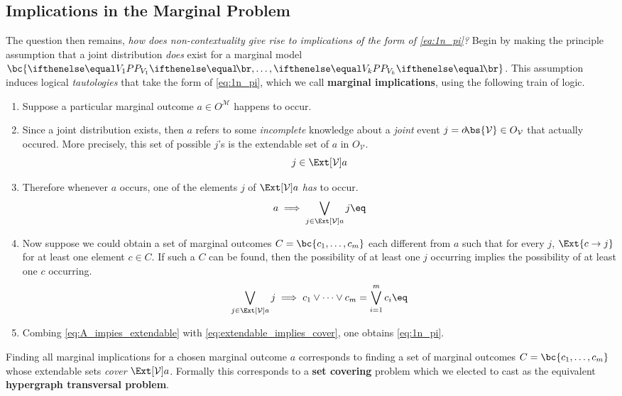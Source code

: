 \documentclass[aps, 10pt, english, twoside, pra, nofootinbib, longbibliography]{revtex4-1}
\theoremstyle{plain}
\theoremstyle{definition}
\theoremstyle{remark}
\newcommand{\term}[1]{\textcolor{Mahogany}{\textbf{#1}}}
\newcommand{\outc}[1]{o\!\bs{#1}}
\begin{document}
    \subsection{Implications in the Marginal Problem}
    \label{sec:implications_marginal_problem}
    The question then remains, \textit{how does non-contextuality give rise to implications of the form of \cref{eq:1n_pi}?} Begin by making the principle assumption that a joint distribution \textit{does} exist for a marginal model $\bc{\prob[V_1], \ldots, \prob[V_k]}$. This assumption induces logical \textit{tautologies} that take the form of \cref{eq:1n_pi}, which we call \term{marginal implications}, using the following train of logic.
    \begin{enumerate}
        \item Suppose a particular marginal outcome $a \in O^{\mathcal{M}}$ happens to occur.
        \item Since a joint distribution exists, then $a$ refers to some \textit{incomplete} knowledge about a \textit{joint} event $j = \outc{\mathcal{V}} \in O_{\mathcal{V}}$ that actually occured. More precisely, this set of possible $j$'s is the extendable set of $a$ in $O_{\mathcal{V}}$.
        \[ j \in \Ext[\mathcal{V}]{a} \]
        \item Therefore whenever $a$ occurs, one of the elements $j$ of $\Ext[\mathcal{V}]{a}$ \textit{has} to occur.
        \[ a \implies \bigvee_{j \in \Ext[\mathcal{V}]{a}} j \eq \label{eq:A_impies_extendable}\]
        \item Now suppose we could obtain a set of marginal outcomes $C = \bc{c_1, \ldots, c_m}$ each different from $a$ such that for every $j$, $\Ext{c \to j}$ for at least one element $c \in C$. If such a $C$ can be found, then the possibility of at least one $j$ occurring implies the possibility of at least one $c$ occurring.
        \[ \bigvee_{j \in \Ext[\mathcal{V}]{a}} j \implies c_1 \vee \cdots \vee c_m = \bigvee_{i = 1}^{m} c_i\eq \label{eq:extendable_implies_cover} \]

        \item Combing \cref{eq:A_impies_extendable} with \cref{eq:extendable_implies_cover}, one obtains \cref{eq:1n_pi}.
    \end{enumerate}


    Finding all marginal implications for a chosen marginal outcome $a$ corresponds to finding a set of marginal outcomes $C = \bc{c_1, \ldots, c_m}$ whose extendable sets \textit{cover} $\Ext[\mathcal{V}]{a}$. Formally this corresponds to a \term{set covering} problem  which we elected to cast as the equivalent \term{hypergraph transversal problem}.
\end{document}
